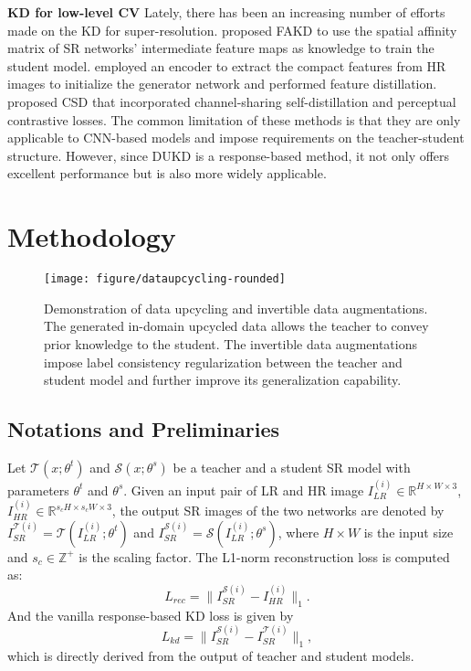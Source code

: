 \documentclass[10pt,twocolumn,letterpaper]{article}
\begin{document}
\noindent\textbf{KD for low-level CV}
Lately, there has been an increasing number of efforts made on the KD for super-resolution. 
\citet{he2020fakd} proposed FAKD to use the spatial affinity matrix of SR networks' intermediate feature maps as knowledge to train the student model. \citet{lee2020learning} employed an encoder to extract the compact features from HR images to initialize the generator network and performed feature distillation. \citet{wang2021towards} proposed CSD that incorporated channel-sharing self-distillation and perceptual contrastive losses.
The common limitation of these methods is that they are only applicable to CNN-based models and impose requirements on the teacher-student structure. However, since DUKD is a response-based method, it not only offers excellent performance but is also more widely applicable. \section{Methodology}\label{sec: dukd}
\begin{figure*}  \vspace{-5mm}
	\centering
	\texttt{[image: figure/dataupcycling-rounded]}\vspace{-0.5em}
	\caption{Demonstration of data upcycling and invertible data augmentations. The generated in-domain upcycled data allows the teacher to convey prior knowledge to the student. The invertible data augmentations impose label consistency regularization between the teacher and student model and further improve its generalization capability.}
	\label{fig:methods}\vspace{-1.4em}
\end{figure*}

\subsection{Notations and Preliminaries}
Let $\mathcal{T}(x;\theta^{t})$ and $\mathcal{S}(x;\theta^{s})$ be a teacher and a student SR model with parameters $\theta^{t}$ and $\theta^{s}$. Given an input pair of LR and HR image $I_{LR}^{(i)}\in\mathbb{R}^{H\times W\times 3}$, $I_{HR}^{(i)}\in\mathbb{R}^{s_cH\times s_cW\times 3}$, the output SR images of the two networks are denoted by $I_{SR}^{\mathcal{T}(i)} = \mathcal{T}(I_{LR}^{(i)};\theta^{t})$ and $I_{SR}^{\mathcal{S}(i)} = \mathcal{S}(I_{LR}^{(i)};\theta^{s})$, where $H\times W$ is the input size and $s_c\in\mathbb{Z}^{+}$ is the scaling factor.
The L1-norm reconstruction loss is computed as:
\vspace{-0.25em}\begin{equation}\label{eq:rec-loss}
	L_{rec} = \|I_{SR}^{\mathcal{S}(i)} - I_{HR}^{(i)}\|_1.
\end{equation}
And the vanilla response-based KD loss is given by
\vspace{-0.25em}\begin{equation}\label{eq:kd-loss}
	L_{kd} = \|I_{SR}^{\mathcal{S}(i)} - I_{SR}^{\mathcal{T}(i)}\|_1,
\end{equation}
which is directly derived from the output of teacher and student models. 
\end{document}
